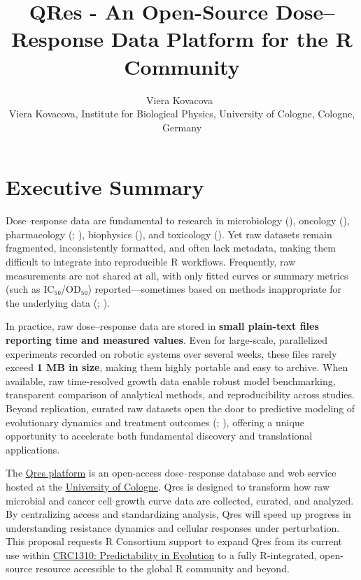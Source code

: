 \documentclass[
]{article}
\title{QRes - An Open-Source Dose--Response Data Platform for the R
Community}
\author{
{\large Viera Kovacova~\orcidlink{0000-0003-4581-4254}}%
 \\%
Viera Kovacova, Institute for Biological Physics, University of Cologne,
Cologne, Germany \\%
{\footnotesize \url{}} \and
}
\date{}
\newcommand{\published}[1]{%
   \gdef\puB{#1}}
\newcommand{\puB}{}
\begin{document}
\published{\textbf{2025-09-30}}

\maketitle






\section{Executive Summary}\label{executive-summary}

Dose--response data are fundamental to research in microbiology
(), oncology (),
pharmacology (; ), biophysics
(), and toxicology
(). Yet raw
datasets remain fragmented, inconsistently formatted, and often lack
metadata, making them difficult to integrate into reproducible R
workflows. Frequently, raw measurements are not shared at all, with only
fitted curves or summary metrics (such as IC₅₀/OD₅₀)
reported---sometimes based on methods inappropriate for the underlying
data (;
).

In practice, raw dose--response data are stored in \textbf{small
plain-text files reporting time and measured values}. Even for
large-scale, parallelized experiments recorded on robotic systems over
several weeks, these files rarely exceed \textbf{1 MB in size}, making
them highly portable and easy to archive. When available, raw
time-resolved growth data enable robust model benchmarking, transparent
comparison of analytical methods, and reproducibility across studies.
Beyond replication, curated raw datasets open the door to predictive
modeling of evolutionary dynamics and treatment outcomes
(;
), offering a unique
opportunity to accelerate both fundamental discovery and translational
applications.

The \href{https://growthcurvedb.shinyapps.io/growthcurvedb/}{Qres
platform} is an open-access dose--response database and web service
hosted at the \href{https://crc1310.uni-koeln.de/}{University of
Cologne}. Qres is designed to transform how raw microbial and cancer
cell growth curve data are collected, curated, and analyzed. By
centralizing access and standardizing analysis, Qres will speed up
progress in understanding resistance dynamics and cellular responses
under perturbation. This proposal requests R Consortium support to
expand Qres from its current use within
\href{https://crc1310.uni-koeln.de/}{CRC1310: Predictability in
Evolution} to a fully R-integrated, open-source resource accessible to
the global R community and beyond.
\end{document}
